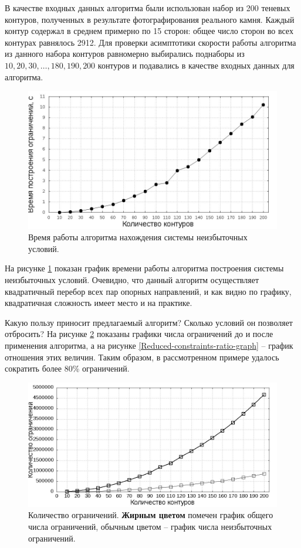 \documentclass[a4paper, 10pt]{article}
\theoremstyle{definition}
\theoremstyle{plain}
\theoremstyle{plain}
\begin{document}
В качестве входных данных алгоритма были использован набор из 200 теневых
контуров, полученных в результате фотографирования реального камня. Каждый
контур содержал в среднем примерно по 15 сторон: общее число сторон во всех
контурах равнялось 2912. Для проверки асимптотики скорости работы алгоритма из
данного набора контуров равномерно выбирались поднаборы из
$10, 20 , 30, \ldots, 180, 190, 200$ контуров и подавались в качестве входных
данных для алгоритма.

\begin{figure}[hh]
 \includegraphics[width=\textwidth]{images/Problem-preparation-time-graph}
 \caption{Время работы алгоритма нахождения системы неизбыточных условий.}
 \label{Problem-preparation-time-graph}
\end{figure}

На рисунке \ref{Problem-preparation-time-graph} показан график времени работы
алгоритма построения системы неизбыточных условий. Очевидно, что данный алгоритм
осуществляет квадратичный перебор всех пар опорных направлений, и как видно по
графику, квадратичная сложность имеет место и на практике.

Какую пользу приносит предлагаемый алгоритм? Сколько условий он позволяет
отбросить? На рисунке \ref{Reduced-constraints-count-graph} показаны графики
числа ограничений до и после применения алгоритма, а на рисунке
\ref{Reduced-constraints-ratio-graph} -- график отношения этих величин. Таким
образом, в рассмотренном примере удалось сократить более 80\% ограничений.

\begin{figure}[hh]
 \includegraphics[width=\textwidth]{images/Reduced-constraints-count-graph}
 \caption{Количество ограничений. \textbf{Жирным цветом} помечен график общего
 числа ограничений, обычным цветом -- график числа неизбыточных ограничений.}
 \label{Reduced-constraints-count-graph}
\end{figure}
\end{document}
